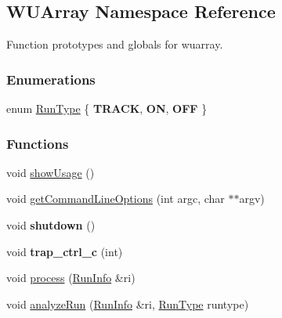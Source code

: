 \hypertarget{namespaceWUArray}{
\subsection{WUArray Namespace Reference}
\label{namespaceWUArray}
}


Function prototypes and globals for wuarray.  


\subsubsection*{Enumerations}
\begin{DoxyCompactItemize}
\item 
enum \hyperlink{namespaceWUArray_abd3f6c10cbcfe7fa4e24e4bce5522ab8}{RunType} \{ {\bfseries TRACK}, 
{\bfseries ON}, 
{\bfseries OFF}
 \}
\end{DoxyCompactItemize}
\subsubsection*{Functions}
\begin{DoxyCompactItemize}
\item 
\hypertarget{namespaceWUArray_ab642d5effbed86a60d236513ba68de8c}{
void \hyperlink{namespaceWUArray_ab642d5effbed86a60d236513ba68de8c}{showUsage} ()}
\label{namespaceWUArray_ab642d5effbed86a60d236513ba68de8c}

\item 
void \hyperlink{namespaceWUArray_a91ddbe526ff9aab8db00c8a40d09867c}{getCommandLineOptions} (int argc, char $\ast$$\ast$argv)
\item 
\hypertarget{namespaceWUArray_a69545c23f3068ab0280f3be54345a006}{
void {\bfseries shutdown} ()}
\label{namespaceWUArray_a69545c23f3068ab0280f3be54345a006}

\item 
\hypertarget{namespaceWUArray_ab448bf290a1eea9d1c5f8ecc9adbcccd}{
void {\bfseries trap\_\-ctrl\_\-c} (int)}
\label{namespaceWUArray_ab448bf290a1eea9d1c5f8ecc9adbcccd}

\item 
void \hyperlink{namespaceWUArray_a7ed5ef4b896abeb0025832e0b5a737bd}{process} (\hyperlink{classRunInfo}{RunInfo} \&ri)
\item 
void \hyperlink{namespaceWUArray_a257a781e9eccd9e0061a1d21afa9329d}{analyzeRun} (\hyperlink{classRunInfo}{RunInfo} \&ri, \hyperlink{namespaceWUArray_abd3f6c10cbcfe7fa4e24e4bce5522ab8}{RunType} runtype)
\end{DoxyCompactItemize}
